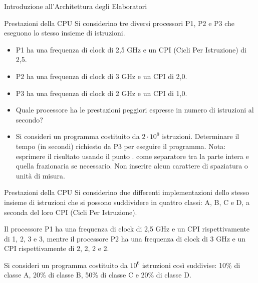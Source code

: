 \documentclass[11pt]{article}
\begin{document}
\begin{quiz}{Introduzione all'Architettura degli Elaboratori}
\begin{cloze}[points=1,shuffle=false]{Prestazioni della CPU}
    Si considerino tre diversi processori P1, P2 e P3 che eseguono lo stesso insieme di istruzioni. 
    \begin{itemize}
        \item P1 ha una frequenza di clock di 2,5 GHz e un CPI (Cicli Per Istruzione) di 2,5. 
        \item P2 ha una frequenza di clock di 3 GHz e un CPI di 2,0.
        \item P3 ha una frequenza di clock di 2 GHz e un CPI di 1,0.
    \end{itemize}
    \begin{itemize}
    \item Quale processore ha le prestazioni peggiori espresse in numero di istruzioni al secondo? 
    \item Si consideri un programma costituito da $2\cdot10^9$ istruzioni. Determinare il tempo (in secondi) richiesto da P3 per eseguire il programma.
    Nota: esprimere il risultato usando il punto . come separatore tra la parte intera e quella frazionaria se necessario. Non inserire alcun carattere di spaziatura o unità di misura.
    \end{itemize}
\end{cloze}

\begin{cloze}[points=1,shuffle=true]{Prestazioni della CPU}
Si considerino due differenti implementazioni dello stesso insieme di istruzioni che si possono suddividere in quattro classi: A, B, C e D, a seconda del loro CPI (Cicli Per Istruzione). 

Il processore P1 ha una frequenza di clock di 2,5 GHz e un CPI rispettivamente di 1, 2, 3 e 3, mentre il processore P2 ha una frequenza di clock di 3 GHz e un CPI rispettivamente di 2, 2, 2 e 2.

Si consideri un programma costituito da $10^6$ istruzioni così suddivise: 10\% di classe A, 20\% di classe B, 50\% di classe C e 20\% di classe D. 


\end{cloze}
\end{quiz}
\end{document}
